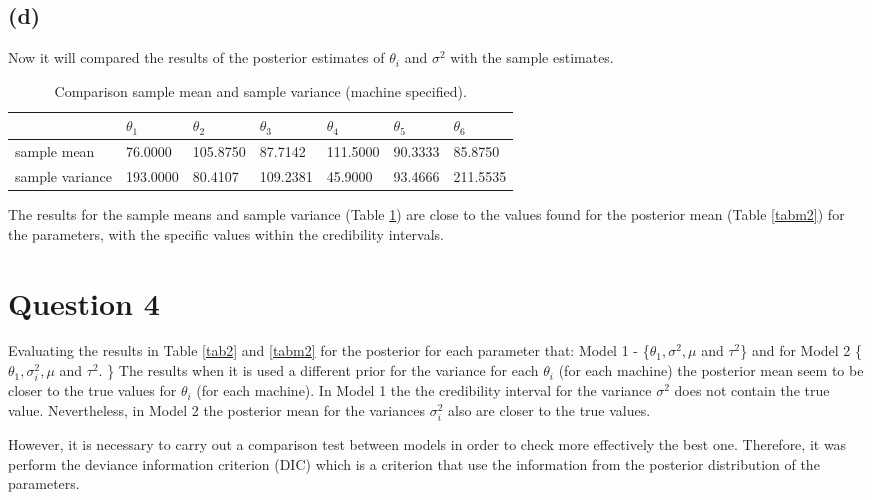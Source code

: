 \documentclass[a4paper, 11pt]{article}
\begin{document}
\subsection*{(d)} Now it will compared the results of the posterior estimates of $\theta_i$ and $\sigma^2$ with the sample estimates.

\begin{table}[H]
\centering
\begin{tabular}{lllllll}
\hline
& $\theta_1$  & $\theta_2$ & $\theta_3$ & $\theta_4$ & $\theta_5$ & $\theta_6$ \\
\hline
sample mean & 76.0000     & 105.8750    & 87.7142      & 111.5000     & 90.3333     & 85.8750      \\    
\hline
sample variance & 193.0000 & 80.4107 & 109.2381 &  45.9000 & 93.4666 & 211.5535 \\
\hline
\end{tabular}
\caption{Comparison sample mean and sample variance (machine specified).}
\label{tab3m2}
\end{table}

The results for the sample means and sample variance (Table \ref{tab3m2}) are close to the values found for the posterior mean (Table \ref{tabm2}) for the parameters, with the specific values within the credibility intervals. 



\section*{Question 4}

Evaluating the results in Table \ref{tab2} and \ref{tabm2} for the posterior for each parameter that: Model 1 - \{$\theta_1, \sigma^2, \mu$ and $\tau^2$\} and for Model 2 \{$\theta_1, \sigma_i^2, \mu$ and $\tau^2$. \} The results when it is used a different prior for the variance for each $\theta_i$ (for each machine) the posterior mean seem to be closer to the true values for $\theta_i$ (for each machine). In Model 1 the the credibility interval for the variance $\sigma^2$ does not contain the true value. Nevertheless, in Model 2 the posterior mean for the variances $\sigma_i^2$ also are closer to the true values.

However, it is necessary to carry out a comparison test between models in order to check more effectively the best one. Therefore, it was perform the deviance information criterion (DIC) which is a criterion that use the information from the posterior distribution of the parameters.
\end{document}
